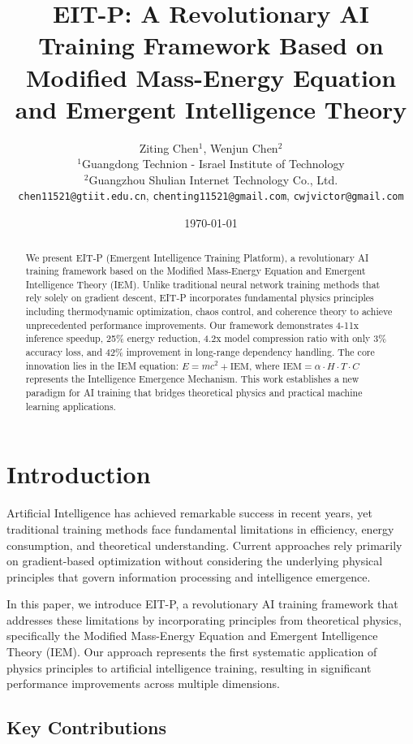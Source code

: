 \documentclass[12pt]{article}
\title{EIT-P: A Revolutionary AI Training Framework Based on Modified Mass-Energy Equation and Emergent Intelligence Theory}
\author{
Ziting Chen$^1$, Wenjun Chen$^2$ \\
$^1$Guangdong Technion - Israel Institute of Technology \\
$^2$Guangzhou Shulian Internet Technology Co., Ltd. \\
\texttt{chen11521@gtiit.edu.cn}, \texttt{chenting11521@gmail.com}, \texttt{cwjvictor@gmail.com}
}
\date{\today}
\begin{document}
\maketitle

\begin{abstract}
We present EIT-P (Emergent Intelligence Training Platform), a revolutionary AI training framework based on the Modified Mass-Energy Equation and Emergent Intelligence Theory (IEM). Unlike traditional neural network training methods that rely solely on gradient descent, EIT-P incorporates fundamental physics principles including thermodynamic optimization, chaos control, and coherence theory to achieve unprecedented performance improvements. Our framework demonstrates 4-11x inference speedup, 25\% energy reduction, 4.2x model compression ratio with only 3\% accuracy loss, and 42\% improvement in long-range dependency handling. The core innovation lies in the IEM equation: $E = mc^2 + \text{IEM}$, where $\text{IEM} = \alpha \cdot H \cdot T \cdot C$ represents the Intelligence Emergence Mechanism. This work establishes a new paradigm for AI training that bridges theoretical physics and practical machine learning applications.
\end{abstract}

\section{Introduction}

Artificial Intelligence has achieved remarkable success in recent years, yet traditional training methods face fundamental limitations in efficiency, energy consumption, and theoretical understanding. Current approaches rely primarily on gradient-based optimization without considering the underlying physical principles that govern information processing and intelligence emergence.

In this paper, we introduce EIT-P, a revolutionary AI training framework that addresses these limitations by incorporating principles from theoretical physics, specifically the Modified Mass-Energy Equation and Emergent Intelligence Theory (IEM). Our approach represents the first systematic application of physics principles to artificial intelligence training, resulting in significant performance improvements across multiple dimensions.

\subsection{Key Contributions}
\end{document}
